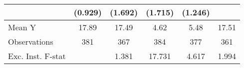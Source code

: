 {\begin{tabular}{l*{5}{c}}
            &     (0.929)         &     (1.692)         &     (1.715)         &     (1.246)         &                     \\
\midrule
Mean Y      &       17.89         &       17.49         &        4.62         &        5.48         &       17.51         \\
Observations&         381         &         367         &         384         &         377         &         361         \\
Exc. Inst. F-stat&                     &       1.381         &      17.731         &       4.617         &       1.994         \\
\bottomrule
\end{tabular}
}
